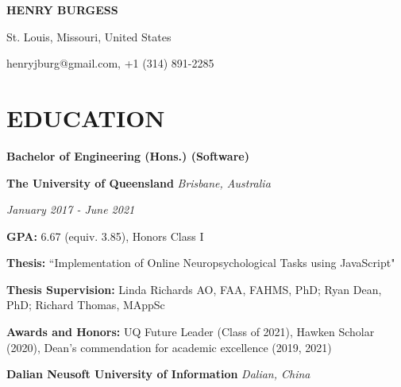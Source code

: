 \documentclass{article}
\begin{document}
  \begin{center}
    {\huge\textbf{\uppercase{Henry Burgess}}}

    St. Louis, Missouri, United States

    henryjburg@gmail.com, +1 (314) 891-2285
  \end{center}

  \smallbreak

  \begin{comment}
  Highly adaptable Software Engineer with over two years of full-stack development experience, currently residing in St. Louis, United States.
  Sponsored to relocate from Australia and work for the Department of Neuroscience at Washington University School of Medicine in St. Louis.
  Working on advancing online behavioral and cognitive testing capabilities and large-scale scientific metadata management. Effective presentation and communication skills across functions and in professional forums.
  Seeking a role delivering objectives towards positive societal development, allowing personal investment in professional and technical capabilities within the United States.
  \end{comment}

  \section*{\centering\uppercase{Education}}

  {\large\textbf{Bachelor of Engineering (Hons.) (Software)}}

  \smallbreak

  \textbf{The University of Queensland} \hfill \textit{Brisbane, Australia}

  \textit{January 2017 - June 2021}

  \textbf{GPA:} 6.67 (equiv. 3.85), Honors Class I

  \textbf{Thesis:} ``Implementation of Online Neuropsychological Tasks using JavaScript"

  \textbf{Thesis Supervision:} Linda Richards AO, FAA, FAHMS, PhD; Ryan Dean, PhD; Richard Thomas, MAppSc

  \textbf{Awards and Honors:} UQ Future Leader (Class of 2021), Hawken Scholar (2020), Dean's commendation for academic excellence (2019, 2021)

  \smallbreak

  \textbf{Dalian Neusoft University of Information} \hfill \textit{Dalian, China}
\end{document}
